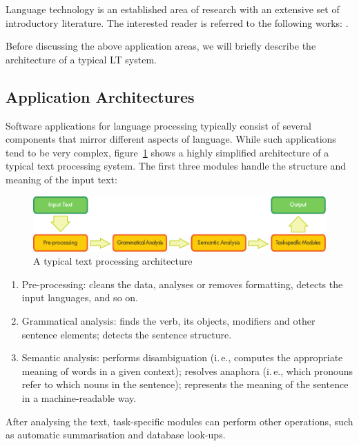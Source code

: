 \begin{multicols}{2}
Language technology is an established area of research with an extensive set of introductory literature. The interested reader is referred to the following works:  \cite{carstensen-etal1, jurafsky-martin01, manning-schuetze1, lt-world1, lt-survey1}.

Before discussing the above application areas, we will briefly describe the architecture of a typical LT system.

\subsection{Application Architectures}

Software applications for language processing typically consist of several components that mirror different aspects of language. While such applications tend to be very complex, figure~\ref{fig:textprocessingarch_en} shows a highly simplified architecture of a typical text processing system. The first three modules handle the structure and meaning of the input text:

\begin{figure}[hb]
  \center
  \includegraphics[width=\textwidth]{../_media/english/text_processing_app_architecture}
  \caption{A typical text processing architecture}
  \label{fig:textprocessingarch_en}
\end{figure}

\begin{enumerate}
\item Pre-processing: cleans the data, analyses or removes formatting, detects the input languages, and so on.
\item Grammatical analysis: finds the verb, its objects, modifiers and other sentence elements; detects the sentence structure.
\item Semantic analysis: performs disambiguation (i.\,e., computes the appropriate meaning of words in a given context); resolves anaphora (i.\,e., which pronouns refer to which nouns in the sentence); represents the meaning of the sentence in a machine-readable way.
\end{enumerate}

After analysing the text, task-specific modules can perform other operations, such as automatic summarisation and database look-ups.


\end{multicols}
